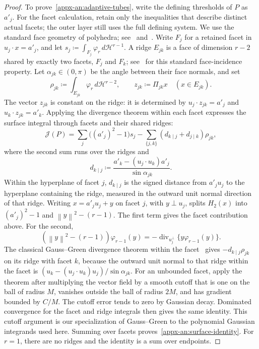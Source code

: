 \documentclass[11pt,letterpaper]{article}
\theoremstyle{remark}
\newcommand{\norm}[1]{\left\lVert#1\right\rVert}
\newcommand{\dd}{\,d}
\newcommand{\surf}{\mathcal J}
\begin{document}
\begin{proof}
To prove~\eqref{appx-an:adaptive-tubes}, write the defining thresholds
of \(P\) as \(a'_j\). For the facet calculation, retain only the
inequalities that describe distinct actual facets; the outer layer
still uses the full defining system. We use the standard face geometry
of polyhedra; see~\cite[\S\S18--19]{Rockafellar1970}
and~\cite[Chapter~2]{Ziegler1995}. Write \(F_j\) for a retained
facet in \(u_j\cdot x=a'_j\), and let
\(s_j\coloneqq \int_{F_j}\varphi_r\dd\mathcal H^{r-1}\).
A ridge \(E_{jk}\) is a face of dimension \(r-2\) shared by exactly
two facets, \(F_j\) and \(F_k\); see~\cite[Chapter~2]{Ziegler1995}
for this standard face-incidence property. Let \(\alpha_{jk}\in(0,\pi)\) be the
angle between their face normals, and set
\[
 \rho_{jk}\coloneqq \int_{E_{jk}}\varphi_r\dd\mathcal H^{r-2},\qquad
 z_{jk}\coloneqq \Pi_{jk}x\quad(x\in E_{jk}).
\]
The vector \(z_{jk}\) is constant on the ridge: it is determined by
\(u_j\cdot z_{jk}=a'_j\) and \(u_k\cdot z_{jk}=a'_k\).
Applying the divergence theorem within each facet expresses the
surface integral through facets and their shared ridges:
\begin{equation}
 \surf(P)=\sum_j\bigl((a'_j)^2-1\bigr)s_j
       -\sum_{\{j,k\}}(d_{k\mid j}+d_{j\mid k})\rho_{jk},
 \label{appx-an:surface-identity}
\end{equation}
where the second sum runs over the ridges and
\[
 d_{k\mid j}\coloneqq \frac{a'_k-(u_j\cdot u_k)a'_j}{\sin\alpha_{jk}}.
\]
Within the hyperplane of facet \(j\), \(d_{k\mid j}\) is the signed
distance from \(a'_ju_j\) to the hyperplane containing the ridge,
measured in the outward unit normal direction of that ridge.
Writing \(x=a'_ju_j+y\) on facet \(j\), with \(y\perp u_j\),
splits \(H_2(x)\) into \((a'_j)^2-1\) and \(\norm y^2-(r-1)\).
The first term gives the facet contribution above. For the second,
\[
 (\norm y^2-(r-1))\varphi_{r-1}(y)
 =-\operatorname{div}_{u_j^\perp}\{y\varphi_{r-1}(y)\}.
\]
The classical Gauss--Green divergence theorem within the
facet~\cite[Chapter~5]{EvansGariepy2015} gives
\(-d_{k\mid j}\rho_{jk}\) on its ridge with facet \(k\), because
the outward unit normal to that ridge within the facet is
\((u_k-(u_j\cdot u_k)u_j)/\sin\alpha_{jk}\).
For an unbounded facet, apply the theorem after multiplying the
vector field by a smooth cutoff that is one on the ball of radius
\(M\), vanishes outside the ball of radius \(2M\), and has gradient
bounded by \(C/M\). The cutoff error tends to zero by Gaussian decay.
Dominated convergence for the facet and ridge integrals then gives
the same identity. This cutoff argument is our specialization of
Gauss--Green to the polynomial Gaussian integrands used here.
Summing over facets proves~\eqref{appx-an:surface-identity}.
For \(r=1\), there are no ridges and the identity is a sum over endpoints.


\end{proof}
\end{document}
